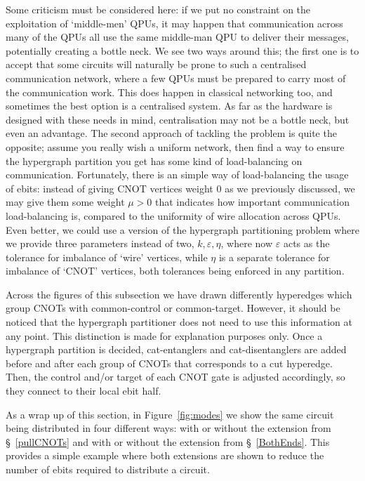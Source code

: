 Some criticism must be considered here: if we put no constraint on the exploitation of `middle-men' QPUs, it may happen that communication across many of the QPUs all use the same middle-man QPU to deliver their messages, potentially creating a bottle neck. We see two ways around this; the first one is to accept that some circuits will naturally be prone to such a centralised communication network, where a few QPUs must be prepared to carry most of the communication work. This does happen in classical networking too, and sometimes the best option is a centralised system. As far as the hardware is designed with these needs in mind, centralisation may not be a bottle neck, but even an advantage. The second approach of tackling the problem is quite the opposite; assume you really wish a uniform network, then find a way to ensure the hypergraph partition you get has some kind of load-balancing on communication. Fortunately, there is an simple way of load-balancing the usage of ebits: instead of giving CNOT vertices weight \(0\) as we previously discussed, we may give them some weight \(\mu > 0\) that indicates how important communication load-balancing is, compared to the uniformity of wire allocation across QPUs. Even better, we could use a version of the hypergraph partitioning problem where we provide three parameters instead of two, \(k,\varepsilon,\eta\), where now \(\varepsilon\) acts as the tolerance for imbalance of `wire' vertices, while \(\eta\) is a separate tolerance for imbalance of `CNOT' vertices, both tolerances being enforced in any partition.


Across the figures of this subsection we have drawn differently hyperedges which group CNOTs with common-control or common-target. However, it should be noticed that the hypergraph partitioner does not need to use this information at any point. This distinction is made for explanation purposes only. Once a hypergraph partition is decided, cat-entanglers and cat-disentanglers are added before and after each group of CNOTs that corresponds to a cut hyperedge. Then, the control and/or target of each CNOT gate is adjusted accordingly, so they connect to their local ebit half.

As a wrap up of this section, in Figure~\ref{fig:modes} we show the same circuit being distributed in four different ways: with or without the extension from \S~\ref{pullCNOTs} and with or without the extension from \S~\ref{BothEnds}. This provides a simple example where both extensions are shown to reduce the number of ebits required to distribute a circuit.

